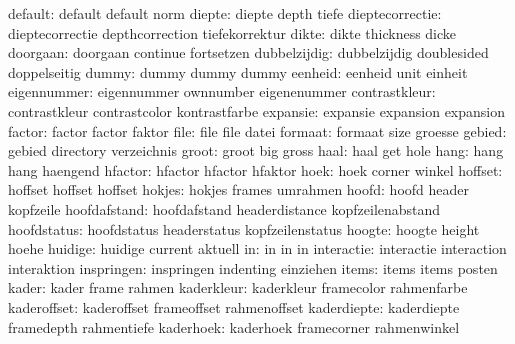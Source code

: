             default:  default              default             norm
             diepte:  diepte               depth               tiefe
    dieptecorrectie:  dieptecorrectie      depthcorrection     tiefekorrektur
              dikte:  dikte                thickness           dicke
           doorgaan:  doorgaan             continue            fortsetzen
       dubbelzijdig:  dubbelzijdig         doublesided         doppelseitig
              dummy:  dummy                dummy               dummy
            eenheid:  eenheid              unit                einheit
        eigennummer:  eigennummer          ownnumber           eigenenummer
      contrastkleur:  contrastkleur        contrastcolor       kontrastfarbe
           expansie:  expansie             expansion           expansion
             factor:  factor               factor              faktor
               file:  file                 file                datei
            formaat:  formaat              size                groesse
             gebied:  gebied               directory           verzeichnis
              groot:  groot                big                 gross
               haal:  haal                 get                 hole
               hang:  hang                 hang                haengend
            hfactor:  hfactor              hfactor             hfaktor
               hoek:  hoek                 corner              winkel
            hoffset:  hoffset              hoffset             hoffset
             hokjes:  hokjes               frames              umrahmen
              hoofd:  hoofd                header              kopfzeile
       hoofdafstand:  hoofdafstand         headerdistance      kopfzeilenabstand
        hoofdstatus:  hoofdstatus          headerstatus        kopfzeilenstatus
             hoogte:  hoogte               height              hoehe
            huidige:  huidige              current             aktuell
                 in:  in                   in                  in
         interactie:  interactie           interaction         interaktion
         inspringen:  inspringen           indenting           einziehen
              items:  items                items               posten
              kader:  kader                frame               rahmen
         kaderkleur:  kaderkleur           framecolor          rahmenfarbe
        kaderoffset:  kaderoffset          frameoffset         rahmenoffset
        kaderdiepte:  kaderdiepte          framedepth          rahmentiefe
          kaderhoek:  kaderhoek            framecorner         rahmenwinkel
